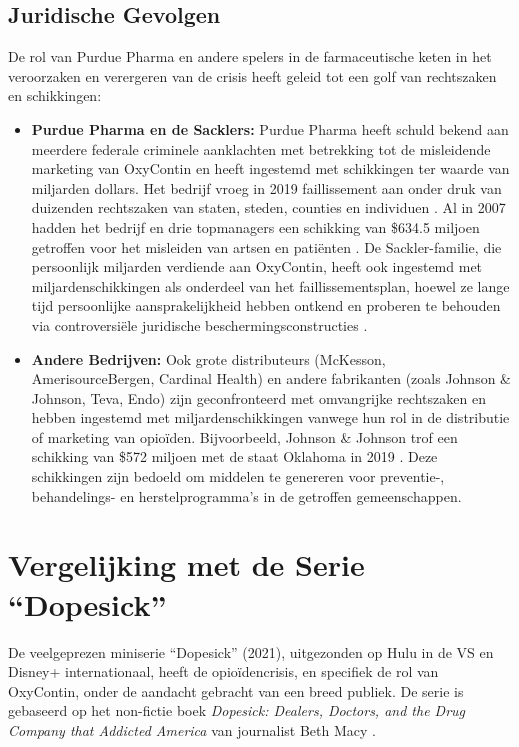 \documentclass[11pt, a4paper]{report} %
\begin{document}
\subsection{Juridische Gevolgen}
De rol van Purdue Pharma en andere spelers in de farmaceutische keten in het veroorzaken en verergeren van de crisis heeft geleid tot een golf van rechtszaken en schikkingen:
\begin{itemize}
    \item \textbf{Purdue Pharma en de Sacklers:} Purdue Pharma heeft schuld bekend aan meerdere federale criminele aanklachten met betrekking tot de misleidende marketing van OxyContin en heeft ingestemd met schikkingen ter waarde van miljarden dollars. Het bedrijf vroeg in 2019 faillissement aan onder druk van duizenden rechtszaken van staten, steden, counties en individuen \parencite{JusticeDeptPurdueResolution}. Al in 2007 hadden het bedrijf en drie topmanagers een schikking van \$634.5 miljoen getroffen voor het misleiden van artsen en patiënten \parencite{HealthlineDopesickTruth}. De Sackler-familie, die persoonlijk miljarden verdiende aan OxyContin, heeft ook ingestemd met miljardenschikkingen als onderdeel van het faillissementsplan, hoewel ze lange tijd persoonlijke aansprakelijkheid hebben ontkend en proberen te behouden via controversiële juridische beschermingsconstructies \parencite{HealthlineDopesickTruth}.
    \item \textbf{Andere Bedrijven:} Ook grote distributeurs (McKesson, AmerisourceBergen, Cardinal Health) en andere fabrikanten (zoals Johnson \& Johnson, Teva, Endo) zijn geconfronteerd met omvangrijke rechtszaken en hebben ingestemd met miljardenschikkingen vanwege hun rol in de distributie of marketing van opioïden. Bijvoorbeeld, Johnson \& Johnson trof een schikking van \$572 miljoen met de staat Oklahoma in 2019 \parencite{WikipediaOpioidEpidemicUS}. Deze schikkingen zijn bedoeld om middelen te genereren voor preventie-, behandelings- en herstelprogramma's in de getroffen gemeenschappen.
\end{itemize}

\section{Vergelijking met de Serie \enquote{Dopesick}}
De veelgeprezen miniserie \enquote{Dopesick} (2021), uitgezonden op Hulu in de VS en Disney+ internationaal, heeft de opioïdencrisis, en specifiek de rol van OxyContin, onder de aandacht gebracht van een breed publiek. De serie is gebaseerd op het non-fictie boek \textit{Dopesick: Dealers, Doctors, and the Drug Company that Addicted America} van journalist Beth Macy \parencite{AmazonDopesickBook}.
\end{document}
